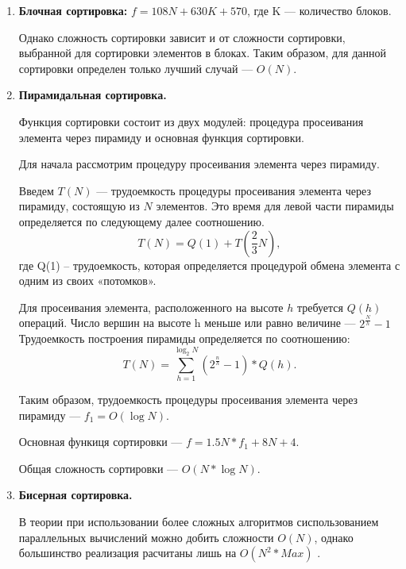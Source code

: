 \documentclass[a4paper,14pt, unknownkeysallowed]{extreport}
\begin{document}
\begin{enumerate}
    \item \textbf{Блочная сортировка:} $f = 108N + 630K + 570$,
     где K --- количество блоков. 
     
     Однако сложность сортировки зависит и от сложности сортировки, выбранной для сортировки элементов в блоках.
     Таким образом, для данной сортировки определен только лучший случай --- $O(N)$.
    
    \item \textbf{Пирамидальная сортировка.}
    
    Функция сортировки состоит из двух модулей: процедура просеивания элемента через пирамиду и основная функция сортировки.

    Для начала рассмотрим процедуру просеивания элемента через пирамиду.
    
    Введем $T(N)$ --- трудоемкость процедуры просеивания элемента через пирамиду, состоящую из $N$ элементов. Это время для левой части пирамиды определяется по следующему далее соотношению.
    \begin{equation}
       T(N)=Q(1)+T(\frac{2}{3}N),
    \end{equation}
     где Q(1) – трудоемкость, которая определяется процедурой обмена элемента с одним из своих «потомков».
     
     Для просеивания элемента, расположенного на высоте $h$ требуется $Q(h)$ операций. Число вершин на высоте h меньше или равно величине --- $2^\frac{N}{h} - 1$
    Трудоемкость построения пирамиды определяется по соотношению:
    \begin{equation}
       T(N)=\sum_{h=1}^{\log_2 N} (2^\frac{n}{h} - 1) * Q(h).
    \end{equation}

    Таким образом, трудоемкость процедуры просеивания элемента через пирамиду --- $f_1 = O(\log N).$

    Основная функиця сортировки --- $f = 1.5N*f_1 + 8N + 4.$

    Общая сложность сортировки --- $O(N*\log N).$

    \item \textbf{Бисерная сортировка.}
    
    В теории при использовании более сложных алгоритмов сиспользованием параллельных вычислений можно добить сложности $O(N)$, однако большинство реализация расчитаны лишь на $O(N^2 * Max)$ \cite{sort}.
    
\end{enumerate}
\end{document}
